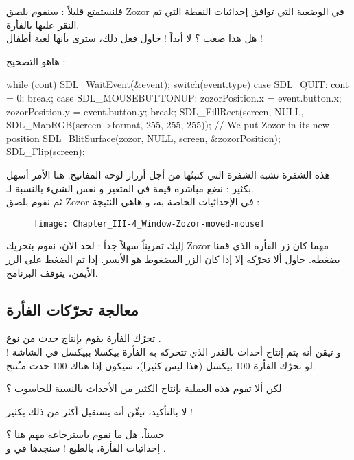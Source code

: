 فلنستمتع قليلاً : سنقوم بلصق 
\textenglish{Zozor}
في الوضعية التي توافق إحداثيات النقطة التي تم النقر عليها بالفأرة.\\
هل هذا صعب ؟ لا أبداً ! حاول فعل ذلك، سترى بأنها لعبة أطفال !

هاهو التصحيح :

\begin{Csource}
while (cont)
{
	SDL_WaitEvent(&event);
	switch(event.type)
	{
		case SDL_QUIT:
		cont = 0;
		break;
		case SDL_MOUSEBUTTONUP:
		zozorPosition.x = event.button.x;
		zozorPosition.y = event.button.y;
		break;
	}
	SDL_FillRect(screen, NULL, SDL_MapRGB(screen->format, 255, 255, 255));
	// We put Zozor in its new position
	SDL_BlitSurface(zozor, NULL, screen, &zozorPosition); 
	SDL_Flip(screen);
}
\end{Csource}

هذه الشفرة تشبه الشفرة التي كتبتُها من أجل أزرار لوحة المفاتيح. هنا الأمر أسهل بكثير : نضع مباشرة قيمة 
في المتغير  
و نفس الشيء بالنسبة لـ.\\
ثم نقوم بلصق
\textenglish{Zozor}
في الإحداثيات الخاصة به، و هاهي النتيجة :

\begin{figure}[H]
	\centering
	\texttt{[image: Chapter\_III-4\_Window-Zozor-moved-mouse]}
\end{figure}

إليك تمريناً سهلاً جداً : لحد الآن، نقوم بتحريك
\textenglish{Zozor}
مهما كان زر الفأرة الذي قمنا بضغطه. حاول ألا تحرّكه إلا إذا كان الزر المضغوط هو الأيسر. إذا تم الضغط على الزر الأيمن، يتوقف البرنامج.

\subsection{معالجة تحرّكات الفأرة}

تحرّك الفأرة يقوم بإنتاج حدث من نوع
.\\
و تيقن أنه يتم إنتاج أحداث بالقدر الذي تتحركه به الفأرة بيكسلا ببيكسل في الشاشة ! لو نحرّك الفأرة 100 بيكسل (هذا ليس كثيرا)، سيكون إذا هناك 100 حدث مـُنتج.

\begin{question}
لكن ألا تقوم هذه العملية بإنتاج الكثير من الأحداث بالنسبة للحاسوب ؟
\end{question}

لا بالتأكيد، تيقّن أنه يستقبل أكثر من ذلك بكثير !

حسناً، هل ما نقوم باسترجاعه مهم هنا ؟\\
إحداثيات الفأرة، بالطبع ! سنجدها في
و
.

